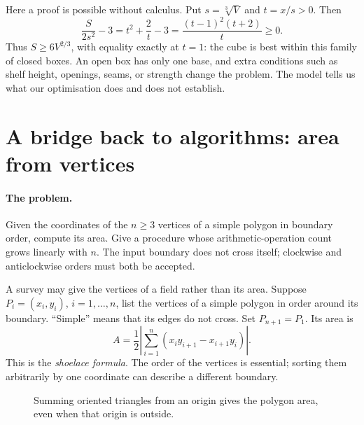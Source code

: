 Here a proof is possible without calculus. Put $s=\sqrt[3]{V}$ and
$t=x/s>0$. Then
\[
\frac{S}{2s^2}-3=t^2+\frac2t-3
=\frac{(t-1)^2(t+2)}t\geq0.
\]
Thus $S\geq6V^{2/3}$, with equality exactly at $t=1$: the cube is best
within this family of closed boxes. An open box has only one base, and
extra conditions such as shelf height, openings, seams, or strength change
the problem. The model tells us what our optimisation does and does not establish.

\section{A bridge back to algorithms: area from vertices}
\label{sec:geo-polygon}
\paragraph{The problem.}
Given the coordinates of the $n\geq3$ vertices of a simple polygon in
boundary order, compute its area. Give a procedure whose arithmetic-operation
count grows linearly with $n$. The input boundary does not cross itself;
clockwise and anticlockwise orders must both be accepted.

A survey may give the vertices of a field rather than its area. Suppose
$P_i=(x_i,y_i)$, $i=1,\ldots,n$, list the vertices of a simple polygon
in order around its boundary. ``Simple'' means that its edges do not cross.
Set $P_{n+1}=P_1$. Its area is
\[
A=\frac12\left|\sum_{i=1}^{n}
(x_i y_{i+1}-x_{i+1}y_i)\right|.
\]
This is the \emph{shoelace formula}. The order of the vertices is essential;
sorting them arbitrarily by one coordinate can describe a different boundary.

\begin{figure}[htbp]\centering
{}
\caption{Summing oriented triangles from an origin gives the polygon area, even when that origin is outside.}
\end{figure}

